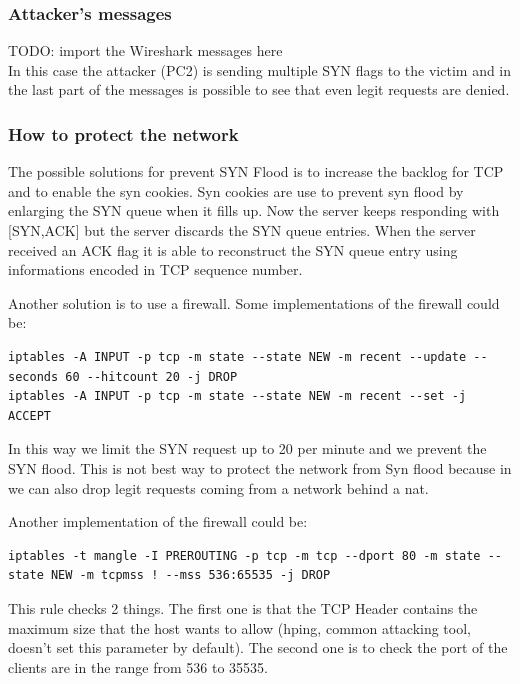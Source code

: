 \subsubsection{Attacker's messages}

{\huge{TODO: import the Wireshark messages here}}\\

In this case the attacker (PC2) is sending multiple SYN flags to the victim and in the last part of the messages is possible to see that even legit requests are denied.\par

\subsubsection{How to protect the network}
The possible solutions for prevent SYN Flood is to increase the backlog for TCP and to enable the syn cookies. Syn cookies are use to prevent syn flood by enlarging the SYN queue when it fills up. Now the server keeps responding with [SYN,ACK] but the server discards the SYN queue entries. When the server received an ACK flag it is able to reconstruct the SYN queue entry using informations encoded in TCP sequence number.\par
Another solution is to use a firewall. Some implementations of the firewall could be:\\
\begin{lstlisting}
iptables -A INPUT -p tcp -m state --state NEW -m recent --update --seconds 60 --hitcount 20 -j DROP
iptables -A INPUT -p tcp -m state --state NEW -m recent --set -j ACCEPT
\end{lstlisting}
In this way we limit the SYN request up to 20 per minute and we prevent the SYN flood. This is not best way to protect the network from Syn flood because in we can also drop legit requests coming from a network behind a nat.\par
Another implementation of the firewall could be:\\
\begin{lstlisting}
iptables -t mangle -I PREROUTING -p tcp -m tcp --dport 80 -m state --state NEW -m tcpmss ! --mss 536:65535 -j DROP
\end{lstlisting}
This rule checks 2 things. The first one is that the TCP Header contains the maximum size that the host wants to allow (hping, common attacking tool, doesn’t set this parameter by default). The second one is to check the port of the clients are in the range from 536 to 35535.\par
